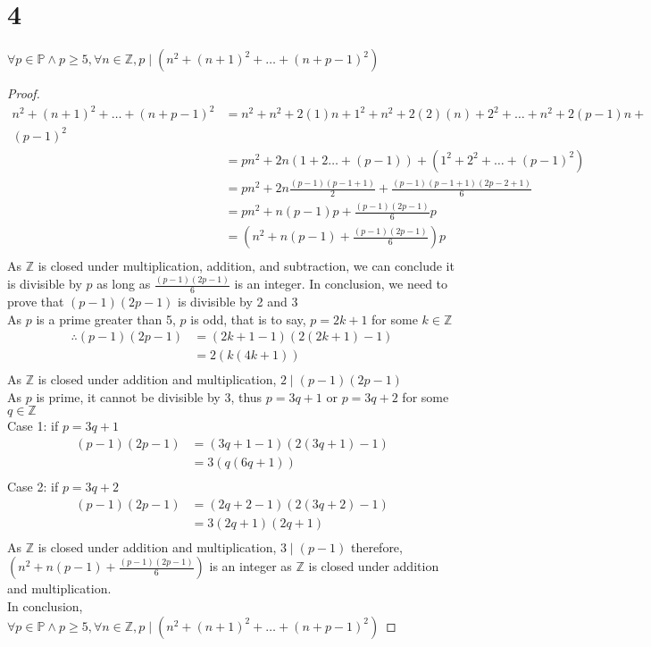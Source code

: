 \documentclass{article}
\begin{document}
\section{4}
$\forall p\in \mathbb{P} \wedge p \geq 5, \forall n \in \mathbb{Z},p \mid (n^2 +(n+1)^2 + \ldots + (n+p-1)^2)$
\begin{proof}
    \begin{align*}
        n^2 +(n+1)^2 + \ldots + (n+p-1)^2 &= n^2 + n^2 + 2(1)n + 1^2 + n^2 + 2(2)(n) + 2^2 + \ldots + n^2 +2(p-1)n + \\
        (p-1)^2 \\
        &= pn^2 + 2n(1+2 \ldots + (p-1)) + (1^2 + 2^2 + \ldots + (p-1)^2) \tag{By algebra}\\
        &= pn^2 + 2n \frac{(p-1)(p-1+1)}{2} + \frac{(p-1)(p-1+1)(2p-2+1)}{6}
        \tag{By Theorem 5.2.1 and Exercise 10}\\
        &= pn^2 + n(p-1)p + \frac{(p-1)(2p-1)}{6}p\\
        &= (n^2 + n(p-1) + \frac{(p-1)(2p-1)}{6})p\\
    \end{align*}
    As $\mathbb{Z}$ is closed under multiplication, addition, and subtraction, we can conclude it is divisible by $p$ as long as $\frac{(p-1)(2p-1)}{6}$ is an integer. In conclusion, we need to prove that $(p-1)(2p-1)$ is divisible by 2 and 3\\
    As $p$ is a prime greater than 5, $p$ is odd, that is to say, $p = 2k + 1$ for some $k \in \mathbb{Z}$\\
    \begin{align*}
        \therefore
        (p-1)(2p-1) &= (2k+1-1)(2(2k+1)-1)\\
        &= 2(k(4k+1))\\
    \end{align*}
    As $\mathbb{Z}$ is closed under addition and multiplication, $2 \mid (p-1)(2p-1)$\\
    As $p$ is prime, it cannot be divisible by 3, thus $p = 3q + 1$ or $p = 3q + 2$ for some $q \in \mathbb{Z}$\\
    Case 1: if $p = 3q + 1$\\
    \begin{align*}
        (p-1)(2p-1) &= (3q+1-1)(2(3q+1)-1)\\
        &= 3(q(6q+1))\\
    \end{align*}
    Case 2: if $p = 3q + 2$\\
    \begin{align*}
        (p-1)(2p-1) &= (2q + 2 - 1)(2(3q+2) - 1)\\
        &= 3(2q+1)(2q+1)\\
    \end{align*}
    As $\mathbb{Z}$ is closed under addition and multiplication, $3 \mid (p-1)$
    therefore, $(n^2 + n(p-1) + \frac{(p-1)(2p-1)}{6})$ is an integer as $\mathbb{Z}$ is closed under addition and multiplication.\\
    In conclusion, $\forall p\in \mathbb{P} \wedge p \geq 5, \forall n \in \mathbb{Z},p \mid (n^2 +(n+1)^2 + \ldots + (n+p-1)^2)$
\end{proof}
\end{document}
